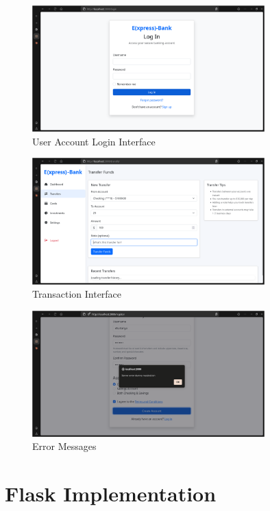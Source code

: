 \begin{figure}[h]
    \centering
    \includegraphics[width=0.8\textwidth]{express_assets/login.png}
    \caption{User Account Login Interface}
\end{figure}

\begin{figure}[h]
    \centering
    \includegraphics[width=0.8\textwidth]{express_assets/transfers.png}
    \caption{Transaction Interface}
\end{figure}

\begin{figure}[h]
    \centering
    \includegraphics[width=0.8\textwidth]{express_assets/error.png}
    \caption{Error Messages}
\end{figure}

\chapter{Flask Implementation}
